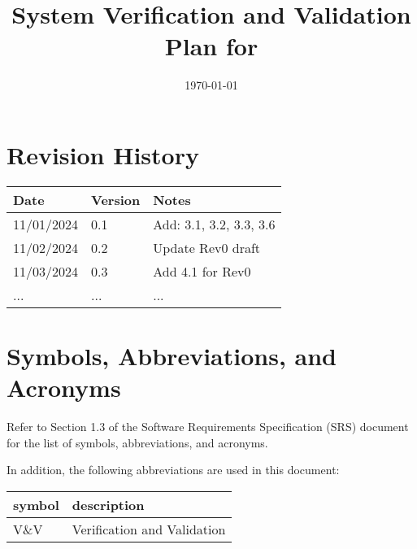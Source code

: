 \documentclass[12pt, titlepage]{article}
\begin{document}
\title{System Verification and Validation Plan for \progname{}} 
\author{\authname}
\date{\today}
	
\maketitle


\section*{Revision History}

\begin{tabularx}{\textwidth}{p{3cm}p{2cm}X}
\toprule {\bf Date} & {\bf Version} & {\bf Notes}\\
\midrule
11/01/2024 & 0.1 & Add: 3.1, 3.2, 3.3, 3.6\\
11/02/2024 & 0.2 & Update Rev0 draft\\
11/03/2024 & 0.3 & Add 4.1 for Rev0\\
... & ... & ...\\
\bottomrule
\end{tabularx}

\newpage

\tableofcontents

\newpage

\section{Symbols, Abbreviations, and Acronyms}

Refer to Section 1.3 of the Software Requirements Specification (SRS) document
for the list of symbols, abbreviations, and acronyms.

In addition, the following abbreviations are used in this document:\\

\renewcommand{\arraystretch}{1.2}
\begin{tabular}{l l} 
  \toprule		
  \textbf{symbol} & \textbf{description}\\
  \midrule 
  V\&V & Verification and Validation\\
  \bottomrule
\end{tabular}\\

\newpage

\end{document}
